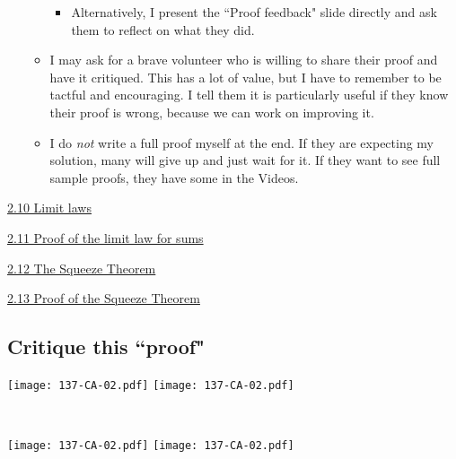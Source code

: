 \documentclass[11pt]{article}
\newcommand{\n}{\newpage}
\newcommand{\vx}{\hspace{8mm} \href{https://www.youtube.com/watch?v=nUepIw5kC2s&list=PLlwePzQY_wW8P_I8BFgm0-upywEwTKd8_&index=10}{2.10 Limit laws}}
\newcommand{\vxi}{\hspace{8mm} \href{https://www.youtube.com/watch?v=p8Ox1LtXyCA&list=PLlwePzQY_wW8P_I8BFgm0-upywEwTKd8_&index=11}{2.11 Proof of the limit law for sums}}
\newcommand{\vxii}{\hspace{8mm} \href{https://www.youtube.com/watch?v=7TGgWs_qCWY&list=PLlwePzQY_wW8P_I8BFgm0-upywEwTKd8_&index=12}{2.12 The Squeeze Theorem}}
\newcommand{\vxiii}{\hspace{8mm} \href{https://www.youtube.com/watch?v=vTonfq94c8s&list=PLlwePzQY_wW8P_I8BFgm0-upywEwTKd8_&index=13}{2.13 Proof of the Squeeze Theorem}}
\begin{document}
\begin{comments}
\begin{itemize}
\begin{itemize}
\begin{itemize}
						\item Alternatively, I present the ``Proof feedback" slide directly and ask them to reflect on what they did.
					\end{itemize}
				\item I may ask for a brave volunteer who is willing to share their proof and have it critiqued.  This has a lot of value, but I have to remember to be tactful and encouraging.  I tell them it is particularly useful if they know their proof is wrong, because we can work on improving it.
				\item I do \emph{not} write a full proof myself at the end.  If they are expecting my solution, many will give up and just wait for it.  If they want to see full sample proofs, they have some in the Videos.
			\end{itemize}
	\end{itemize}
\end{comments}

\begin{videos}
\vx

\vxi 

\vxii 

\vxiii
\end{videos}

\n
\newpage
\subsection{Critique this ``proof"} 

\begin{center}
{ \texttt{[image: 137-CA-02.pdf]}}
\quad
{ \texttt{[image: 137-CA-02.pdf]}}

\

{ \texttt{[image: 137-CA-02.pdf]}}
\quad
{ \texttt{[image: 137-CA-02.pdf]}}

\end{center}
\end{document}

